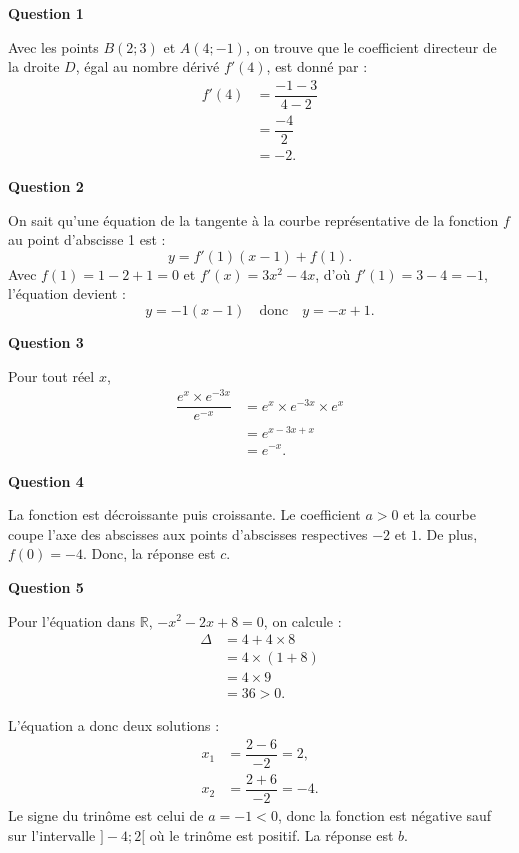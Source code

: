 \textbf{Question 1}
	
	Avec les points $B(2; 3)$ et $A(4; -1)$, on trouve que le coefficient directeur de la droite $D$, égal au nombre dérivé $f'(4)$, est donné par : 
	\begin{align*}
		f'(4) &= \dfrac{-1-3}{4-2} \\
		&= \dfrac{-4}{2} \\
		&= -2.
	\end{align*}
	
	\textbf{Question 2}
	
	On sait qu'une équation de la tangente à la courbe représentative de la fonction $f$ au point d'abscisse 1 est : 
	\[
	y  = f'(1)(x - 1)+f(1).
	\]
	Avec $f(1) = 1-2+1 = 0$ et $f'(x) = 3x^2 - 4x$, d'où $f'(1) = 3-4 = -1$, l'équation devient :
	\[
	y  = -1(x - 1) \quad \text{donc} \quad y = -x + 1.
	\]
	
	\textbf{Question 3}
	
	Pour tout réel $x$, 
	\begin{align*}
		\dfrac{e^x \times e^{-3x}}{e^{-x}} &= e^x \times e^{-3x} \times e^x \\
		&= e^{x - 3x + x} \\
		&= e^{-x}.
	\end{align*}
	
	\textbf{Question 4}
	
	La fonction est décroissante puis croissante. Le coefficient $a > 0$ et la courbe coupe l'axe des abscisses aux points d'abscisses respectives $-2$ et $1$. De plus, $f(0) = -4$. Donc, la réponse est $c$.
	
	\textbf{Question 5}
	
	Pour l'équation dans $\mathbb{R}$, $-x^2 - 2x + 8 = 0$, on calcule :
	\begin{align*}
		\Delta &= 4 + 4 \times 8 \\
		&= 4 \times (1 + 8) \\
		&= 4 \times 9 \\
		&= 36 > 0.
	\end{align*}
	
	L'équation a donc deux solutions :
	\begin{align*}
		x_1 &= \dfrac{2-6}{-2} = 2, \\
		x_2 &= \dfrac{2 + 6}{-2} = -4.
	\end{align*}
	Le signe du trinôme est celui de $a = -1 < 0$, donc la fonction est négative sauf sur l'intervalle $]-4; 2[$ où le trinôme est positif. La réponse est $b$.
